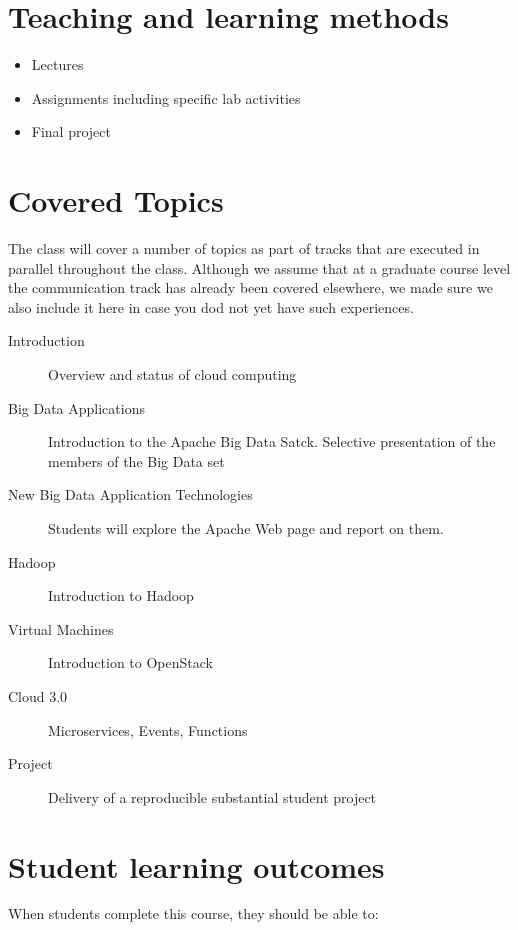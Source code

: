 \section{Teaching and learning methods}


\begin{itemize}
\item Lectures
\item Assignments including specific lab activities
\item Final project 
\end{itemize}

\section{Covered Topics}

The class will cover a number of topics as part of tracks that are
executed in parallel throughout the class. Although we assume that at
a graduate course level the communication track has already been
covered elsewhere, we made sure we also include it here in case you dod
not yet have such experiences.

\begin{description}

\item[Introduction] Overview and status of cloud computing
\item[Big Data Applications] Introduction to the Apache Big Data
  Satck. Selective presentation of the members of the Big Data set
\item[New Big Data Application Technologies] Students will
  explore the Apache Web page and report on them.
\item[Hadoop] Introduction to Hadoop
\item[Virtual Machines] Introduction to OpenStack
\item[Cloud 3.0] Microservices, Events, Functions  
\item[Project] Delivery of a reproducible substantial student project
 
\end{description}


\section{Student learning outcomes}

When students complete this course, they should be able to:

